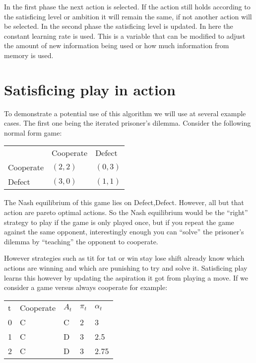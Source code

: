 \toReview In the first phase the next action is selected. If the action still holds
according to the satisficing level or ambition it will remain the same, if not another
action will be selected. In the second phase the satisficing level is updated.
In here the constant learning rate is used. This is a variable that can be
modified to adjust the amount of new information being used or how much
information from memory is used.


\section{Satisficing play in action}
\drafting
To demonstrate a potential use of this algorithm we will use at several example
cases. The first one being the iterated prisoner's dilemma. Consider
the following normal form game:

\begin{tabular}{lll}
            & Cooperate   & Defect \\
  Cooperate & $(2,2)$     & $(0,3)$  \\
  Defect    & $(3,0)$     & $(1,1)$  \\
\end{tabular}

\drafting The Nash equilibrium of this game lies on Defect,Defect. However, all but
that action are pareto optimal actions. So the Nash equilibrium would be the
``right'' strategy to play if the game is only played once, but if you repeat
the game against the same opponent, interestingly enough you can ``solve''
the prisoner's dilemma by ``teaching'' the opponent to cooperate.

\drafting However strategies such as tit for tat or win stay lose shift already know
which actions are winning and which are punishing to try and solve it.
Satisficing play learns this however by updating the aspiration it got from
playing a move. If we consider a game versus always cooperate for example:

\begin{tabular}{lllll}
    t & Cooperate & $A_t$ & $\pi_t$ & $\alpha_t$ \\
    0 & C     & C    & 2       & 3 \\
    1 & C     & D    & 3       & 2.5 \\
    2 & C     & D    & 3       & 2.75 \\
\end{tabular}

